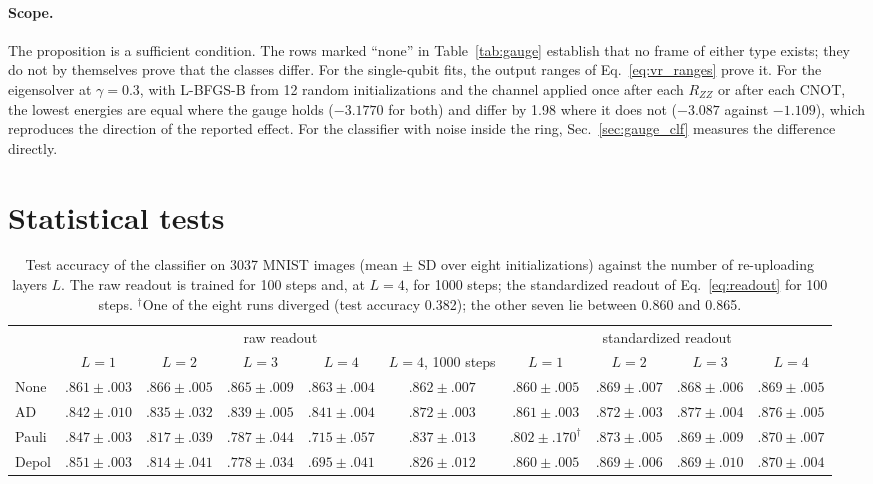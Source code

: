 \documentclass[
 aps,pra,
 twocolumn,
 superscriptaddress,
 longbibliography,
 nofootinbib
]{revtex4-2}
\begin{document}
\paragraph{Scope.}
The proposition is a sufficient condition. The rows marked ``none'' in
Table~\ref{tab:gauge} establish that no frame of either type exists; they do not by
themselves prove that the classes differ. For the single-qubit fits, the output
ranges of Eq.~\eqref{eq:vr_ranges} prove it. For the eigensolver at $\gamma=0.3$, with L-BFGS-B
from 12 random initializations and the channel applied once after each
$R_{ZZ}$ or after each CNOT, the lowest energies are equal where the gauge
holds ($-3.1770$ for both) and differ by 1.98 where it does not ($-3.087$
against $-1.109$), which reproduces the direction of the reported effect. For the
classifier with noise inside the
ring, Sec.~\ref{sec:gauge_clf} measures the difference directly.

\section{Statistical tests}
\label{app:stats}

\begin{table}[t]
\caption{Test accuracy of the classifier on 3037 MNIST images (mean $\pm$ SD
over eight initializations) against the number of re-uploading layers $L$.
The raw readout is trained for 100 steps and, at $L=4$, for 1000 steps; the
standardized readout of Eq.~\eqref{eq:readout} for 100 steps.
$^\dagger$One of the eight runs diverged (test accuracy 0.382); the other seven
lie between 0.860 and 0.865.}
\label{tab:clf}
\begin{ruledtabular}
\begin{tabular}{lccccccccc}
 & \multicolumn{5}{c}{raw readout} & \multicolumn{4}{c}{standardized readout}\\
 & $L=1$ & $L=2$ & $L=3$ & $L=4$ & $L=4$, 1000 steps & $L=1$ & $L=2$ & $L=3$ & $L=4$\\
\colrule
None & $.861\pm.003$ & $.866\pm.005$ & $.865\pm.009$ & $.863\pm.004$ & $.862\pm.007$ & $.860\pm.005$ & $.869\pm.007$ & $.868\pm.006$ & $.869\pm.005$\\
AD & $.842\pm.010$ & $.835\pm.032$ & $.839\pm.005$ & $.841\pm.004$ & $.872\pm.003$ & $.861\pm.003$ & $.872\pm.003$ & $.877\pm.004$ & $.876\pm.005$\\
Pauli & $.847\pm.003$ & $.817\pm.039$ & $.787\pm.044$ & $.715\pm.057$ & $.837\pm.013$ & $.802\pm.170^\dagger$ & $.873\pm.005$ & $.869\pm.009$ & $.870\pm.007$\\
Depol & $.851\pm.003$ & $.814\pm.041$ & $.778\pm.034$ & $.695\pm.041$ & $.826\pm.012$ & $.860\pm.005$ & $.869\pm.006$ & $.869\pm.010$ & $.870\pm.004$\\
\end{tabular}
\end{ruledtabular}
\end{table}
\end{document}
